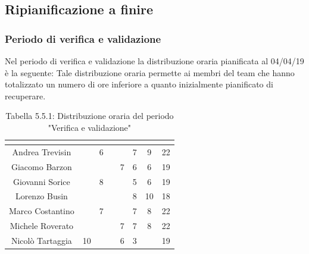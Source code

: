 \subsection{Ripianificazione a finire}

\subsubsection{Periodo di verifica e validazione}
Nel periodo di verifica e validazione la distribuzione oraria pianificata al 04/04/19 è la seguente:
Tale distribuzione oraria permette ai membri del team che hanno totalizzato un numero di ore inferiore a quanto inizialmente pianificato di recuperare.

\renewcommand{\arraystretch}{1.5}
\begin{table}[H]
\begin{center}
\begin{tabular}{|c|c|c|c|c|c|c|c|}
\hline
\rowcolor{title_row}
\textbf{\color{title_text}{Nome}} & \textbf{\color{title_text}{Resp.}} & \textbf{\color{title_text}{Ammi.}} & \textbf{\color{title_text}{Analist.}} & \textbf{\color{title_text}{Progett.}} & \textbf{\color{title_text}{Program.}} & \textbf{\color{title_text}{Verific.}} & \textbf{\color{title_text}{Totale}} \\ \hline
Andrea Trevisin  & & 6 & & & 7 & 9 & 22  \\ \hline
Giacomo Barzon   & & & & 7 & 6 & 6 & 19  \\ \hline
Giovanni Sorice  & & 8 & &  & 5 & 6 & 19  \\ \hline
Lorenzo Busin    & & & & & 8 & 10 & 18  \\ \hline
Marco Costantino & & 7 & & & 7 & 8 & 22  \\ \hline
Michele Roverato & & & & 7 & 7 & 8 & 22  \\ \hline
Nicolò Tartaggia & 10 & & & 6 & 3 & & 19  \\ \hline
\end{tabular}
\caption{Tabella 5.5.1: Distribuzione oraria del periodo "Verifica e validazione"\label{}}
\end{center}
\end{table}
\renewcommand{\arraystretch}{1}


